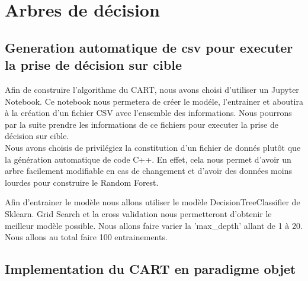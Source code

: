 \documentclass[10pt]{article}
\begin{document}
\section{Arbres de décision}


\subsection{Generation automatique de csv pour executer la prise de décision sur cible}

Afin de construire l'algorithme du CART, nous avons choisi d'utiliser un Jupyter Notebook. Ce notebook nous permetera de créer le modéle, l'entrainer et aboutira à la création d'un fichier CSV avec l'ensemble des informations. Nous pourrons par la suite prendre les informations de ce fichiers pour executer la prise de décision sur cible.\\
Nous avons choisis de privilégiez la constitution d'un fichier de donnés plutôt que la génération automatique de code C++. En effet, cela nous permet d'avoir un arbre facilement modifiable en cas de changement et d'avoir des données moins lourdes pour construire le Random Forest.


Afin d'entrainer le modèle nous allons utiliser le modèle DecisionTreeClassifier de Sklearn. Grid Search et la cross validation nous permetteront d'obtenir le meilleur modèle possible. Nous allons faire varier la 'max\_depth' allant de 1 à 20. Nous allons au total faire 100 entrainements.

\subsection{Implementation du CART en paradigme objet}
\end{document}
